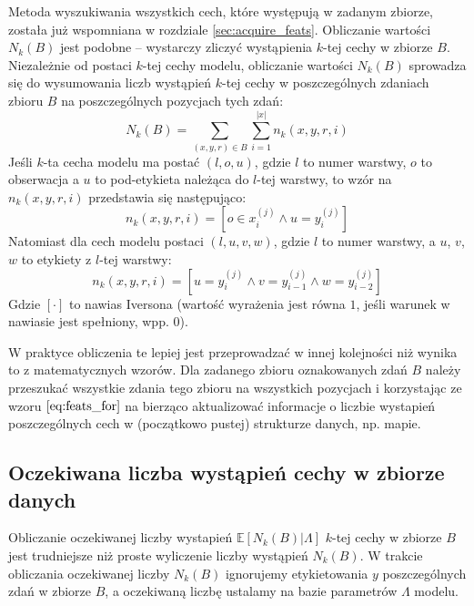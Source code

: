 \documentclass[a4paper,10]{article}
\begin{document}
Metoda wyszukiwania wszystkich cech, które występują w zadanym zbiorze,
została już wspomniana w rozdziale \ref{sec:acquire_feats}.
Obliczanie wartości $N_k(B)$ jest podobne -- wystarczy zliczyć wystąpienia $k$-tej
cechy w zbiorze $B$. Niezależnie od postaci $k$-tej cechy modelu,
obliczanie wartości $N_k(B)$ sprowadza się do wysumowania liczb
wystąpień $k$-tej cechy w poszczególnych zdaniach zbioru $B$ na poszczególnych
pozycjach tych zdań:
\begin{equation}
N_k(B) = \sum_{(x, y, r) \in B} \sum_{i=1}^{|x|} n_k(x, y, r, i)
\end{equation}
Jeśli $k$-ta cecha modelu ma postać $(l, o, u)$,
gdzie $l$ to numer warstwy, $o$ to obserwacja a $u$ to pod-etykieta należąca
do $l$-tej warstwy, to wzór na $n_k(x, y, r, i)$ przedstawia się następująco:
\begin{equation}
n_k(x, y, r, i) = [o \in x^{(j)}_i \land u = y^{(j)}_i]
\end{equation}
Natomiast dla cech modelu postaci $(l, u, v, w)$, gdzie $l$ to numer warstwy,
a $u$, $v$, $w$ to etykiety z $l$-tej warstwy:
\begin{equation}
n_k(x, y, r, i) = [u = y^{(j)}_i \land v = y^{(j)}_{i-1} \land w = y^{(j)}_{i-2}]
\end{equation}
Gdzie $[\cdot]$ to nawias Iversona (wartość wyrażenia jest równa $1$, jeśli
warunek w nawiasie jest spełniony, wpp. $0$).

W praktyce obliczenia te
lepiej jest przeprowadzać w innej kolejności niż wynika to z matematycznych
wzorów. Dla zadanego zbioru oznakowanych zdań $B$ należy przeszukać
wszystkie zdania tego zbioru na wszystkich pozycjach i korzystając ze wzoru
$\ref{eq:feats_for}$ na bierząco aktualizować informacje o liczbie wystapień
poszczególnych cech w (początkowo pustej) strukturze danych, np. mapie.

\subsection{Oczekiwana liczba wystąpień cechy w zbiorze danych}

Obliczanie oczekiwanej liczby wystapień
$\mathbb E \left[ N_k(B) \vert \Lambda \right]$ $k$-tej cechy w zbiorze $B$
jest trudniejsze niż proste wyliczenie liczby wystąpień $N_k(B)$.
W trakcie obliczania oczekiwanej liczby $N_k(B)$ ignorujemy etykietowania
$y$ poszczególnych zdań w zbiorze $B$, a oczekiwaną liczbę ustalamy
na bazie parametrów $\Lambda$ modelu.
\end{document}
